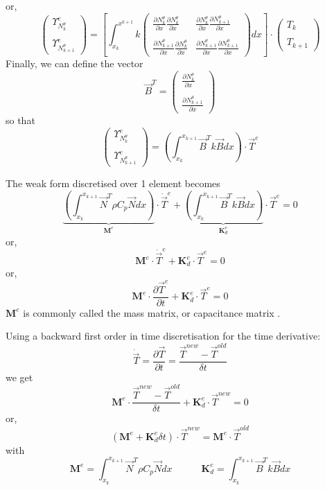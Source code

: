 or,
\[
\left(
\begin{array}{cc}
 {\Upsilon}_{N_k^\theta}^e \\ \\ {\Upsilon}_{N_{k+1}^\theta}^e
\end{array}
\right)
=
\left[
\int_{x_k}^{x^{k+1}}
k
\left(
\begin{array}{cc}
\frac{\partial N_k^\theta}{\partial x}  \frac{\partial  N_{k}^\theta } {\partial x}   & 
\frac{\partial N_k^\theta}{\partial x}  \frac{\partial  N_{k+1}^\theta } {\partial x}  
\\ \\
\frac{\partial N_{k+1}^\theta}{\partial x}  \frac{\partial  N_{k}^\theta } {\partial x}   & 
\frac{\partial N_{k+1}^\theta}{\partial x}  \frac{\partial  N_{k+1}^\theta } {\partial x}  
\end{array}
\right)
dx
\right]
\cdot
\left(
\begin{array}{c}
T_k \\ \\ T_{k+1}
\end{array}
\right)
\]
Finally, we can define the vector 
\[
{\vec B}^T=
\left(
\begin{array}{cc}
 \frac{\partial N_k^\theta}{\partial x}   \\ \\
 \frac{\partial N_{k+1}^\theta}{\partial x}
\end{array}
\right)
\]
so that 
\[
\left(
\begin{array}{cc}
 {\Upsilon}_{N_k^\theta}^e \\ \\ {\Upsilon}_{N_{k+1}^\theta}^e
\end{array}
\right)
=
\left( \int_{x_k}^{x_{k+1}}   {\vec B}^T k {\vec B} dx  \right) \cdot {\vec T}^e
\]

The weak form discretised over 1 element becomes
\[
\underbrace{\left( \int_{x_k}^{x_{k+1}}   {\vec N}^T \rho C_p {\vec N} dx  \right) }_{\bm M^e} \cdot \dot{\vec T}^e
+
\underbrace{\left( \int_{x_k}^{x_{k+1}}   {\vec B}^T k {\vec B} dx  \right)}_{{\bm K}_d^e} \cdot {\vec T}^e
=0
\]
or,
\[
\boxed{
{\bm M}^e \cdot \dot{\vec T}^e + {\bm K}_d^e \cdot {\vec T}^e = 0
}
\]
or,
\[
\boxed{
{\bm M}^e \cdot \frac{\partial {\vec T}^e}{\partial t} + {\bm K}_d^e \cdot {\vec T}^e = 0
}
\]
${\bm M}^e$ is commonly called the mass matrix, or capacitance matrix \cite[p103]{reddybook2}.

Using a backward first order in time discretisation for the time derivative:
\[
\dot{\vec T}= \frac{\partial {\vec T}}{\partial t} = \frac{{\vec T}^{new}-{\vec T}^{old}}{\delta t}
\]
we get
\[
{\bm M}^e \cdot \frac{{\vec T}^{new}-{\vec T}^{old}}{\delta t} + {\bm K}_d^e \cdot {\vec T}^{new} = 0
\]
or, 
\[
\boxed{
( {\bm M}^e +  {\bm K}_d^e  \delta t ) \cdot {\vec T}^{new} =  {\bm M}^e \cdot  {\vec T}^{old}
}
\]
with 
\[
{\bm M}^e=  \int_{x_k}^{x_{k+1}}   {\vec N}^T \rho C_p {\vec N} dx  
\quad\quad\quad
{\bm K}_d^e =
 \int_{x_k}^{x_{k+1}}   {\vec B}^T k {\vec B} dx 
\]

